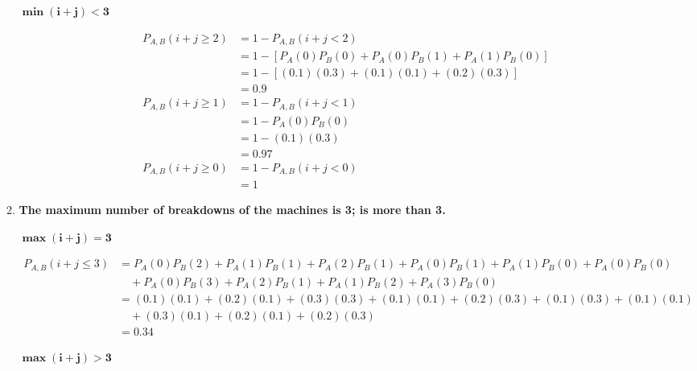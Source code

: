 \documentclass[10pt, oneside]{article}
\begin{document}
\begin{enumerate}[label=3.\arabic*]
\begin{enumerate}
	\textbf{$\boxed{\bm{\min(i+j) < 3}}$}

	\begin{align*}
	P_{A,B} (i + j \geq 2) &= 1 - P_{A,B} (i + j < 2) \\
	&= 1 - [P_A(0)P_B(0) + P_A(0)P_B(1) + P_A(1)P_B(0)] \\
	&= 1 - [(0.1)(0.3) + (0.1)(0.1) + (0.2)(0.3) ] \\
	&= \boxed{0.9} \\
	P_{A,B} (i + j \geq 1) &= 1 - P_{A,B} (i + j < 1) \\
	&= 1 - P_A(0)P_B(0) \\
	&= 1 - (0.1)(0.3) \\
	&= \boxed{0.97} \\
	P_{A,B} (i + j \geq 0) &= 1 - P_{A,B} (i + j < 0) \\	
	&= \boxed{1}
	\end{align*}
	
	\item  \begin{tcolorbox}[
	  colback=Cerulean!5!white,
	  colframe=Cerulean!75!black]
	\textbf{The maximum number of breakdowns of the machines is 3; is more than 3.}
	\end{tcolorbox}
	
	\textbf{$\boxed{\bm{\max(i+j) = 3}}$}
	
	\begin{align*}
	P_{A,B} (i + j \leq 3) &= P_A(0)P_B(2) + P_A(1)P_B(1) + P_A(2)P_B(1) + P_A(0)P_B(1) + P_A(1)P_B(0) + P_A(0)P_B(0) \\
	&\quad + P_A(0)P_B(3) + P_A(2)P_B(1) + P_A(1)P_B(2) + P_A(3)P_B(0) \\
	&= (0.1)(0.1) + (0.2)(0.1) + (0.3)(0.3) + (0.1)(0.1) + (0.2)(0.3) + (0.1)(0.3) + (0.1)(0.1) \\ 
	&\quad + (0.3)(0.1) + (0.2)(0.1) + (0.2)(0.3) \\
	&= \boxed{0.34}
	\end{align*}
	
	\textbf{$\boxed{\bm{\max(i+j) > 3}}$}
	

\end{enumerate}
\end{enumerate}
\end{document}
